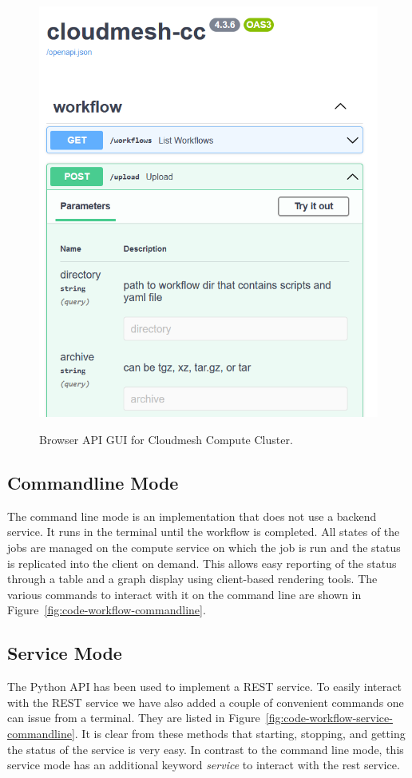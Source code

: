 \begin{figure}[htb]
{\centering
\includegraphics[width=0.52\columnwidth]{images/upload_api.png}
}
\caption{Browser API GUI for Cloudmesh Compute Cluster.}

\label{fig:openapi}

\end{figure}


\subsection{Commandline Mode}

The command line mode is an implementation that does not use a backend
service. It runs in the terminal until the workflow is completed. All
states of the jobs are managed on the compute service on which the job
is run and the status is replicated into the client on demand. This
allows easy reporting of the status through a table and a graph
display using client-based rendering tools. The various commands to
interact with it on the command line are shown in
Figure~\ref{fig:code-workflow-commandline}.


\subsection{Service Mode}

The Python API has been used to implement a REST service. To easily
interact with the REST service we have also added a couple of
convenient commands one can issue from a terminal. They are listed in
Figure~\ref{fig:code-workflow-service-commandline}. It is clear from
these methods that starting, stopping, and getting the status of the
service is very easy. In contrast to the command line mode, this
service mode has an additional keyword {\em service} to interact with
the rest service.

